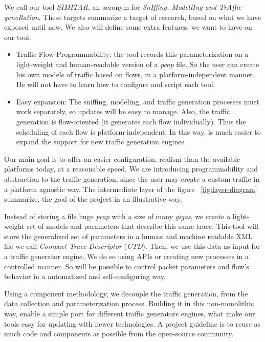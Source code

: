 We call our  tool \textit{SIMITAR}, an acronym for \textit{SnIffing, ModellIng and TrAffic geneRation}.  These targets summarize a target of research, based on what we have exposed until now. We also will define some extra features, we want to have on our tool:

\begin{itemize}

\item Traffic Flow Programmability: the tool records this parameterization on a light-weight and human-readable version of a \textit{pcap} file. So the user can create his own models of traffic based on flows, in a platform-independent manner. He will not have to learn how to configure and script each tool.

\item Easy expansion: The sniffing, modeling, and traffic generation processes must work separately, so updates will be easy to manage. Also, the traffic generation is flow-oriented (it generates each flow individually). Thus the scheduling of each flow is platform-independent. In this way, is much easier to expand the support for new traffic generation engines.

\end{itemize}

Our main goal is to offer an easier configuration, realism than the available platforms today, at a reasonable speed. We are introducing programmability and abstraction to the traffic generation, since the user may create a custom traffic in a platform agnostic way. The intermediate layer of the figure ~\ref{fig:layer-diagram} summarize, the goal of the project in an illustrative way.

Instead of storing a file huge \textit{pcap} with a size of many \textit{gigas}, we create a light-weight set of models and parameters that describe this same trace. This tool will store the generalized set of parameters in a human and machine readable XML file we call \textit{Compact Trace Descriptor} (\textit{CTD}). Then, we use this data as input for a traffic generator engine. We do so using APIs or creating new processes in a controlled manner. So will be possible to control packet parameters and flow's behavior in a automatized and self-configuring way.

Using a component methodology, we decouple the traffic generation, from the data collection and parameterization process. Building it in this non-monolithic way,  enable a simple port for different traffic generators engines, what make our tools easy for updating with newer technologies. A project guideline is to reuse as much code and components as possible from the open-source community.

